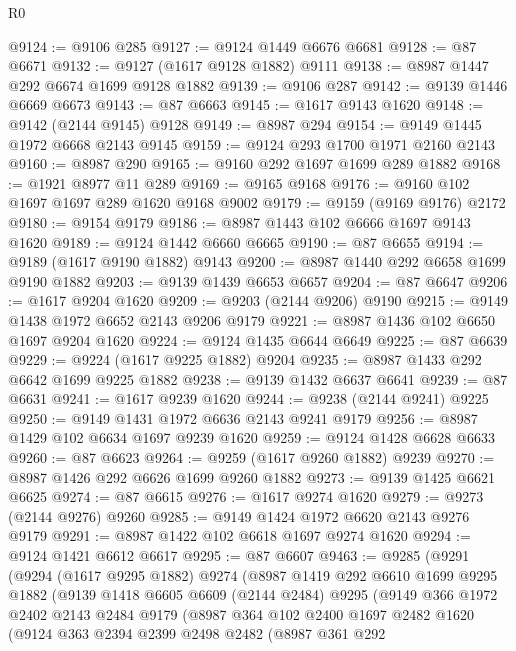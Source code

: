 \begin{lexlean}{R0}
\begin{coremodule}
@9124 := @9106 @285
@9127 := @9124 @1449 @6676 @6681
@9128 := @87 @6671
@9132 := @9127 (@1617 @9128 @1882) @9111
@9138 := @8987 @1447 @292 @6674 @1699 @9128 @1882
@9139 := @9106 @287
@9142 := @9139 @1446 @6669 @6673
@9143 := @87 @6663
@9145 := @1617 @9143 @1620
@9148 := @9142 (@2144 @9145) @9128
@9149 := @8987 @294
@9154 := @9149 @1445 @1972 @6668 @2143 @9145
@9159 := @9124 @293 @1700 @1971 @2160 @2143
@9160 := @8987 @290
@9165 := @9160 @292 @1697 @1699 @289 @1882
@9168 := @1921 @8977 @11 @289
@9169 := @9165 @9168
@9176 := @9160 @102 @1697 @1697 @289 @1620 @9168 @9002
@9179 := @9159 (@9169 @9176) @2172
@9180 := @9154 @9179
@9186 := @8987 @1443 @102 @6666 @1697 @9143 @1620
@9189 := @9124 @1442 @6660 @6665
@9190 := @87 @6655
@9194 := @9189 (@1617 @9190 @1882) @9143
@9200 := @8987 @1440 @292 @6658 @1699 @9190 @1882
@9203 := @9139 @1439 @6653 @6657
@9204 := @87 @6647
@9206 := @1617 @9204 @1620
@9209 := @9203 (@2144 @9206) @9190
@9215 := @9149 @1438 @1972 @6652 @2143 @9206 @9179
@9221 := @8987 @1436 @102 @6650 @1697 @9204 @1620
@9224 := @9124 @1435 @6644 @6649
@9225 := @87 @6639
@9229 := @9224 (@1617 @9225 @1882) @9204
@9235 := @8987 @1433 @292 @6642 @1699 @9225 @1882
@9238 := @9139 @1432 @6637 @6641
@9239 := @87 @6631
@9241 := @1617 @9239 @1620
@9244 := @9238 (@2144 @9241) @9225
@9250 := @9149 @1431 @1972 @6636 @2143 @9241 @9179
@9256 := @8987 @1429 @102 @6634 @1697 @9239 @1620
@9259 := @9124 @1428 @6628 @6633
@9260 := @87 @6623
@9264 := @9259 (@1617 @9260 @1882) @9239
@9270 := @8987 @1426 @292 @6626 @1699 @9260 @1882
@9273 := @9139 @1425 @6621 @6625
@9274 := @87 @6615
@9276 := @1617 @9274 @1620
@9279 := @9273 (@2144 @9276) @9260
@9285 := @9149 @1424 @1972 @6620 @2143 @9276 @9179
@9291 := @8987 @1422 @102 @6618 @1697 @9274 @1620
@9294 := @9124 @1421 @6612 @6617
@9295 := @87 @6607
@9463 := @9285
    (@9291
      (@9294
        (@1617 @9295 @1882)
        @9274
        (@8987
          @1419
          @292
          @6610
          @1699
          @9295
          @1882
          (@9139
            @1418
            @6605
            @6609
            (@2144 @2484)
            @9295
            (@9149
              @366
              @1972
              @2402
              @2143
              @2484
              @9179
              (@8987
                @364
                @102
                @2400
                @1697
                @2482
                @1620
                (@9124
                  @363
                  @2394
                  @2399
                  @2498
                  @2482
                  (@8987
                    @361
                    @292

\end{coremodule}
\end{lexlean}
